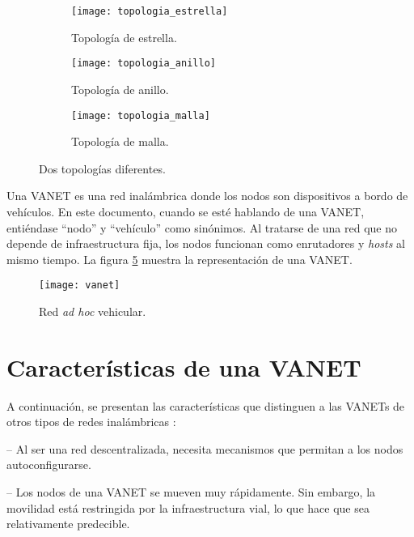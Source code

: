 \begin{figure}[th]
\centering

\begin{subfigure}[b]{0.45\textwidth}
\centering
\texttt{[image: topologia\_estrella]}
\caption[Topología de estrella.]{Topología de estrella.}
\label{fig:topologia_estrella}
\end{subfigure}
\hfill
\begin{subfigure}[b]{0.45\textwidth}
\centering
\texttt{[image: topologia\_anillo]}
\caption[Topología de anillo]{Topología de anillo.}
\label{fig:topologia_anillo}
\end{subfigure}
\hfill
\begin{subfigure}[b]{0.45\textwidth}
\centering
\texttt{[image: topologia\_malla]}
\caption[Topología de malla]{Topología de malla.}
\label{fig:topologia_malla}
\end{subfigure}

\decoRule
\caption[Dos topologías diferentes]{Dos topologías diferentes.}
\label{fig:topologias}
\end{figure}

Una VANET es una red inalámbrica donde los nodos son dispositivos a bordo de
vehículos. En este documento, cuando se esté hablando de una VANET, entiéndase
``nodo'' y ``vehículo'' como sinónimos. Al tratarse de una red que no depende de
infraestructura fija, los nodos funcionan como enrutadores y \textit{hosts} al
mismo tiempo. La figura \ref{fig:vanet} muestra la representación de una VANET.

\begin{figure}[th]
\centering
\texttt{[image: vanet]}
\decoRule
\caption[Red \textit{ad hoc} vehicular]{Red \textit{ad hoc} vehicular.}
\label{fig:vanet}
\end{figure}

\section{Características de una VANET}
\label{sec:caracteristicas_de_una_vanet}

A continuación, se presentan las características que distinguen a las VANETs de
otros tipos de redes inalámbricas \cite{Meneguette2018}:

 -- Al ser una red descentralizada, necesita
mecanismos que permitan a los nodos autoconfigurarse.

 -- Los nodos de una VANET se mueven muy rápidamente. Sin
embargo, la movilidad está restringida por la infraestructura vial, lo que hace
que sea relativamente predecible.


